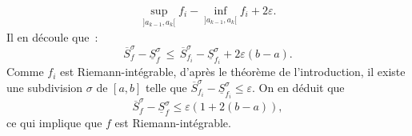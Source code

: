 {\begin{enumerate}
{\begin{eqnarray*}
\sup_{]a_{k-1}, a_{k}[}f_{i} - \inf_{]a_{k-1}, a_{k}[}f_{i} +
2\varepsilon.
\end{eqnarray*}
Il en d\'ecoule que~:
\begin{equation*}
\overline{S}_{f}^{\sigma} - \underline{S}_{f}^{\sigma}\, \leq\,
\overline{S}_{f_{i}}^{\sigma} - \underline{S}_{f_{i}}^{\sigma} +
2\varepsilon (b- a).
\end{equation*}
Comme $f_{i}$ est Riemann-int\'egrable, d'apr\`es le th\'eor\`eme
de l'introduction, il existe une subdivision $\sigma$ de $[a, b]$ telle que
$\overline{S}_{f_{i}}^{\sigma} - \underline{S}_{f_{i}}^{\sigma}
\leq \varepsilon$. On en d\'eduit que
\begin{equation*}
\overline{S}_{f}^{\sigma} - \underline{S}_{f}^{\sigma} \leq
\varepsilon \left(1 + 2(b-a)\right),
\end{equation*}
ce qui implique que $f$ est Riemann-int\'egrable.}
\end{enumerate}
}
